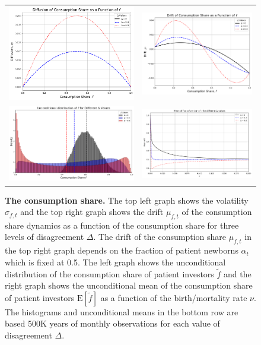 \begin{figure}[htbp]
\centering
\vspace{0.1in}
\begin{tabular}{cc}
\includegraphics[width=.3\textwidth]{figures/sigfALT.png} &
\includegraphics[width=.3\textwidth]{figures/mufALT.png} \\
\includegraphics[width=.3\textwidth]{figures/distfALT.png} &
\includegraphics[width=.3\textwidth]{figures/meanfasnuALT.png}
\end{tabular}
\caption{\textbf{The consumption share.} \footnotesize{The top left graph shows the volatility $\sigma_{f,t}$ and the top right graph shows the drift $\mu_{f,t}$ of the consumption share dynamics as a function of the consumption share for three levels of disagreement $\Delta$. The drift of the consumption share $\mu_{f,t}$ in the top right graph depends on the fraction of patient newborns $\alpha_t$ which is fixed at 0.5. The left graph shows the unconditional distribution of the consumption share of patient investors $\tilde{f}$ and the right graph shows the unconditional mean of the consumption share of patient investors $\mathrm{E}[\tilde{f}]$ as a function of the birth/mortality rate $\nu$. The histograms and unconditional means in the bottom row are based 500K years of monthly observations for each value of disagreement $\Delta$.}} \label{fig:ConsumptionShareALT} 
\end{figure}

